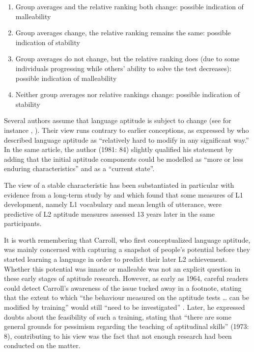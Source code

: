 \documentclass[output=paper]{langsci/langscibook}
\begin{document}
\begin{enumerate}
\item Group averages and the relative ranking both change: possible indication of malleability
\item Group averages change, the relative ranking remains the same: possible indication of stability
\item Group averages do not change, but the relative ranking does (due to some individuals progressing while others’ ability to solve the test decreases): possible indication of malleability
\item Neither group averages nor relative rankings change: possible indication of stability
\end{enumerate}

Several authors assume that language aptitude is subject to change (see for instance \citealt{GrigorenkoEtAl2000}, \citealt{Singleton2017}). Their view runs contrary to earlier conceptions, as expressed by \citet[86]{Carroll1981} who described language aptitude as “relatively hard to modify in any significant way.” In the same article, the author (1981: 84) slightly qualified his statement by adding that the initial aptitude components could be modelled as “more or less enduring characteristics” and as a “current state”.  

The view of a stable characteristic has been substantiated in particular with evidence from a long-term study by \citet{Skehan1986} and \citet{SkehanDucroquet1988} which found that some measures of L1 development, namely L1 vocabulary and mean length of utterance,  were predictive of L2 aptitude measures assessed 13 years later in the same participants.

It is worth remembering that Carroll, who first conceptualized language aptitude, was mainly concerned with capturing a snapshot of people’s potential before they started learning a language in order to predict their later L2 achievement. Whether this potential was innate or malleable was not an explicit question in these early stages of aptitude research. However, as early as 1964, careful readers could detect Carroll’s awareness of the issue tucked away in a footnote, stating that the extent to which “the behaviour measured on the aptitude tests … can be modified by training” would still “need to be investigated” \citep[89]{Carroll1964}. Later, he expressed doubts about the feasibility of such a training, stating that “there are some general grounds for pessimism regarding the teaching of aptitudinal skills” (1973: 8), contributing to his view was the fact that not enough research had been conducted on the matter. 
\end{document}
